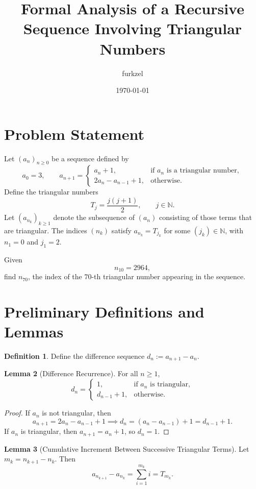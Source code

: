 \documentclass[12pt]{article}
\title{Formal Analysis of a Recursive Sequence Involving Triangular Numbers}
\author{furkzel}
\date{\today}
\theoremstyle{definition}
\newtheorem{definition}{Definition}[section]
\newtheorem{lemma}[definition]{Lemma}
\begin{document}
\maketitle

\section{Problem Statement}
Let $(a_n)_{n\ge0}$ be a sequence defined by
\[
    a_0 = 3, \qquad
    a_{n+1} =
    \begin{cases}
        a_n + 1,            & \text{if } a_n \text{ is a triangular number}, \\[4pt]
        2a_n - a_{n-1} + 1, & \text{otherwise.}
    \end{cases}
\]
Define the triangular numbers
\[
    T_j = \frac{j(j+1)}{2}, \qquad j\in\mathbb{N}.
\]
Let $(a_{n_k})_{k\ge1}$ denote the subsequence of $(a_n)$ consisting of those terms that are triangular.
The indices $(n_k)$ satisfy $a_{n_k} = T_{j_k}$ for some $(j_k) \in \mathbb{N}$, with $n_1=0$ and $j_1=2$.

Given
\[
    n_{10}=2964,
\]
find $n_{70}$, the index of the $70$-th triangular number appearing in the sequence.

\section{Preliminary Definitions and Lemmas}

\begin{definition}
    Define the difference sequence $d_n := a_{n+1} - a_n$.
\end{definition}

\begin{lemma}[Difference Recurrence]
    For all $n\ge1$,
    \[
        d_n =
        \begin{cases}
            1,           & \text{if } a_n \text{ is triangular}, \\[4pt]
            d_{n-1} + 1, & \text{otherwise.}
        \end{cases}
    \]
\end{lemma}

\begin{proof}
    If $a_n$ is not triangular, then
    \[
        a_{n+1} = 2a_n - a_{n-1} + 1 \implies d_n = (a_n - a_{n-1}) + 1 = d_{n-1} + 1.
    \]
    If $a_n$ is triangular, then $a_{n+1} = a_n + 1$, so $d_n = 1$.
\end{proof}

\begin{lemma}[Cumulative Increment Between Successive Triangular Terms]
    Let $m_k = n_{k+1} - n_k$. Then
    \[
        a_{n_{k+1}} - a_{n_k} = \sum_{i=1}^{m_k} i = T_{m_k}.
    \]
\end{lemma}
\end{document}
